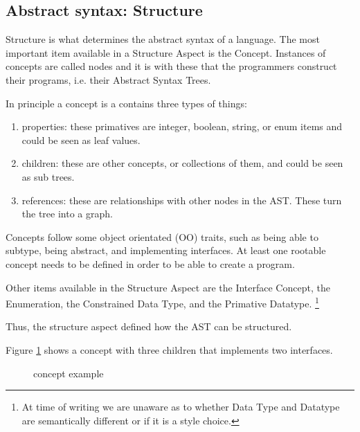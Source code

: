 \subsection{Abstract syntax: Structure}
Structure is what determines the abstract syntax of a language.
The most important item available in a Structure Aspect is the Concept.
Instances of concepts are called nodes and it is with these that the programmers construct their programs, i.e. their Abstract Syntax Trees.

In principle a concept is a contains three types of things:
\begin{enumerate}
    \item properties: these primatives are integer, boolean, string, or enum items and could be seen as leaf values.
    \item children: these are other concepts, or collections of them, and could be seen as sub trees.
    \item references: these are relationships with other nodes in the AST. These turn the tree into a graph.
\end{enumerate}

Concepts follow some object orientated (OO) traits, such as being able to subtype, being abstract, and implementing interfaces.
At least one rootable concept needs to be defined in order to be able to create a program.

Other items available in the Structure Aspect are the Interface Concept, the Enumeration, the Constrained Data Type, and the Primative Datatype.
\footnote{At time of writing we are unaware as to whether Data Type and Datatype are semantically different or if it is a style choice.}

Thus, the structure aspect defined how the AST can be structured.

Figure \ref{fig:concept_example} shows a concept with three children that implements two interfaces.

\begin{figure}[h]
    \centering
    \caption{concept example}
    \label{fig:concept_example}
\end{figure}
 

